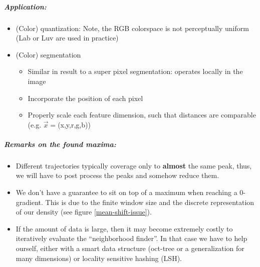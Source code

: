 \subparagraph{Application:}
\begin{itemize}
  \item (Color) quantization: Note, the RGB colorspace is not perceptually uniform (Lab or Luv are used in practice)
  \item (Color) segmentation
    \begin{itemize}
      \item Similar in result to a super pixel segmentation: operates locally in the image
      \item Incorporate the position of each pixel
      \item Properly scale each feature dimension, such that distances are comparable (e.g. $\vec{x} = $(x,y,r,g,b))
    \end{itemize}
\end{itemize}

\subparagraph{Remarks on the found maxima:}
\begin{itemize}
  \item Different trajectories typically coverage only to \textbf{almost} the same peak, thus, we will have to post process the peaks and somehow reduce them.
  \item We don't have a guarantee to sit on top of a maximum when reaching a 0-gradient. This is due to the finite window size and the discrete representation of our density (see figure \ref{mean-shift-issue}).
  \item \label{mean-shift-cost-effectiveness} If the amount of data is large, then it may become extremely costly to iteratively evaluate the ``neighborhood finder''. In that case we have to help ourself, either with a smart data structure (oct-tree or a generalization for many dimensions) or locality sensitive hashing (LSH).
\end{itemize}
